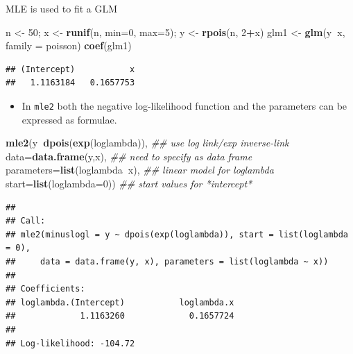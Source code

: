\documentclass[
  ignorenonframetext,
]{beamer}
\newenvironment{Shaded}{\begin{snugshade}}{\end{snugshade}}
\newcommand{\CommentTok}[1]{\textcolor[rgb]{0.56,0.35,0.01}{\textit{#1}}}
\newcommand{\DataTypeTok}[1]{\textcolor[rgb]{0.13,0.29,0.53}{#1}}
\newcommand{\DecValTok}[1]{\textcolor[rgb]{0.00,0.00,0.81}{#1}}
\newcommand{\KeywordTok}[1]{\textcolor[rgb]{0.13,0.29,0.53}{\textbf{#1}}}
\newcommand{\NormalTok}[1]{#1}
\newcommand{\OperatorTok}[1]{\textcolor[rgb]{0.81,0.36,0.00}{\textbf{#1}}}
\newcommand{\StringTok}[1]{\textcolor[rgb]{0.31,0.60,0.02}{#1}}
\providecommand{\tightlist}{%
  \setlength{\itemsep}{0pt}\setlength{\parskip}{0pt}}
\begin{document}
\begin{frame}[fragile]{MLE is used to fit a GLM}
\protect\hypertarget{mle-is-used-to-fit-a-glm}{}

\scriptsize

\begin{Shaded}
\begin{Highlighting}[]
\NormalTok{n <-}\StringTok{ }\DecValTok{50}\NormalTok{; x <-}\StringTok{ }\KeywordTok{runif}\NormalTok{(n, }\DataTypeTok{min=}\DecValTok{0}\NormalTok{, }\DataTypeTok{max=}\DecValTok{5}\NormalTok{); y <-}\StringTok{ }\KeywordTok{rpois}\NormalTok{(n, }\DecValTok{2}\OperatorTok{+}\NormalTok{x)}
\NormalTok{glm1 <-}\StringTok{ }\KeywordTok{glm}\NormalTok{(y}\OperatorTok{~}\NormalTok{x, }\DataTypeTok{family =}\NormalTok{ poisson)}
\KeywordTok{coef}\NormalTok{(glm1)}
\end{Highlighting}
\end{Shaded}

\begin{verbatim}
## (Intercept)           x 
##   1.1163184   0.1657753
\end{verbatim}

\normalsize

\begin{itemize}
\tightlist
\item
  In \texttt{mle2} both the negative log-likelihood function and the
  parameters can be expressed as formulae.
\end{itemize}

\scriptsize

\begin{Shaded}
\begin{Highlighting}[]
\KeywordTok{mle2}\NormalTok{(y}\OperatorTok{~}\KeywordTok{dpois}\NormalTok{(}\KeywordTok{exp}\NormalTok{(loglambda)),       }\CommentTok{## use log link/exp inverse-link}
     \DataTypeTok{data=}\KeywordTok{data.frame}\NormalTok{(y,x),          }\CommentTok{## need to specify as data frame}
     \DataTypeTok{parameters=}\KeywordTok{list}\NormalTok{(loglambda}\OperatorTok{~}\NormalTok{x),  }\CommentTok{## linear model for loglambda}
     \DataTypeTok{start=}\KeywordTok{list}\NormalTok{(}\DataTypeTok{loglambda=}\DecValTok{0}\NormalTok{))       }\CommentTok{## start values for *intercept*}
\end{Highlighting}
\end{Shaded}

\begin{verbatim}
## 
## Call:
## mle2(minuslogl = y ~ dpois(exp(loglambda)), start = list(loglambda = 0), 
##     data = data.frame(y, x), parameters = list(loglambda ~ x))
## 
## Coefficients:
## loglambda.(Intercept)           loglambda.x 
##             1.1163260             0.1657724 
## 
## Log-likelihood: -104.72
\end{verbatim}

\end{frame}
\end{document}
